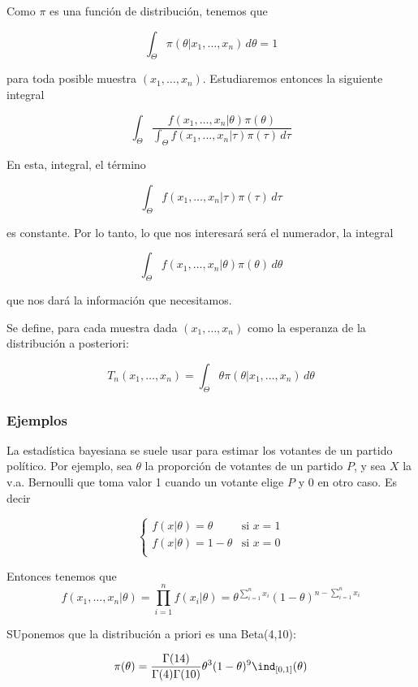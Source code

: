 \documentclass{apuntes}
\begin{document}
Como $\pi$ es una función de distribución, tenemos que 

\[ \int_\Theta \pi(\theta|x_1,\dotsc,x_n)\,d\theta = 1 \]

para toda posible muestra $(x_1,\dotsc,x_n)$. Estudiaremos entonces la siguiente integral

\[ \int_\Theta \frac{f(x_1,\dotsc,x_n|\theta)\pi(\theta)}{\displaystyle \int_\Theta f(x_1,\dotsc,x_n|\tau)\pi(\tau)\,d\tau} \]

En esta, integral, el término 

\[ \int_\Theta f(x_1,\dotsc,x_n|\tau)\pi(\tau)\,d\tau \] 

es constante. Por lo tanto, lo que nos interesará será el numerador, la integral 

\[ \int_\Theta f(x_1,\dotsc,x_n|\theta)\pi(\theta)\,d\theta \] 

que nos dará la información que necesitamos.

\begin{defn} Se define, para cada muestra dada $(x_1,\dotsc,x_n)$ como la esperanza de la distribución a posteriori:

\[ T_n(x_1,\dotsc,x_n) = \int_\Theta \theta\pi(\theta|x_1,\dotsc,x_n)\,d\theta \]
\end{defn}


\subsubsection{Ejemplos}

La estadística bayesiana se suele usar para estimar los votantes de un partido político. Por ejemplo, sea $\theta$ la proporción de votantes de un partido $P$, y sea $X$ la v.a. Bernoulli que toma valor 1 cuando un votante elige $P$ y 0 en otro caso. Es decir

\[ \begin{cases}
f(x|\theta) = \theta &\text{si } x=1 \\
f(x|\theta) = 1 - \theta &\text{si } x=0 \\
\end{cases} \]

Entonces tenemos que \[ f(x_1,\dotsc,x_n|\theta) = \prod_{i=1}^n f(x_i|\theta) = \theta^{\sum_{i=1}^n x_i} (1-\theta)^{n -\sum_{i=1}^n x_i} \]

SUponemos que la distribución a priori es una Beta(4,10):

\[ \pi(\theta) = \frac{\Gamma(14)}{\Gamma(4)\Gamma(10)}\theta^3(1-\theta)^9\ind_{[0,1]}(\theta) \]
\end{document}
